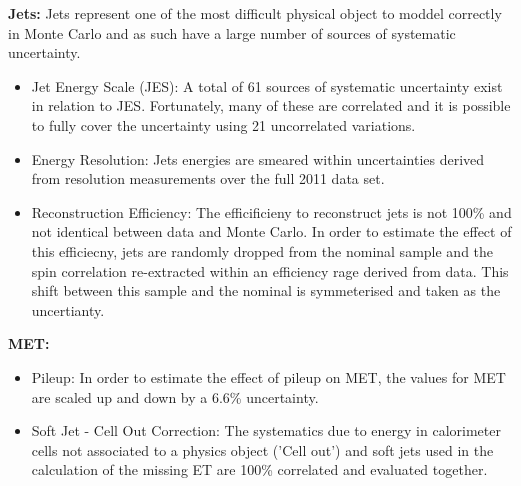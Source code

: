 \vspace{5mm}
\noindent
\textbf{Jets:}
Jets represent one of the most difficult physical object to moddel correctly in Monte Carlo and as such have a large number of sources of systematic uncertainty. 
\begin{itemize}
    \item Jet Energy Scale (JES): A total of 61 sources of systematic uncertainty exist in relation to JES. Fortunately, many of these are correlated and it is possible to fully cover the uncertainty using 21 uncorrelated variations.
    \item Energy Resolution: Jets energies are smeared within uncertainties derived from resolution measurements over the full 2011 data set. 
    \item Reconstruction Efficiency: The efficificieny to reconstruct jets is not 100\% and not identical between data and Monte Carlo. In order to estimate the effect of this efficiecny, jets are randomly dropped from the nominal sample and the spin correlation re-extracted within an efficiency rage derived from data. This shift between this sample and the nominal is symmeterised and taken as the uncertianty.
\end{itemize}

\vspace{5mm}
\noindent
\textbf{MET:}
\begin{itemize}
    \item Pileup: In order to estimate the effect of pileup on MET, the values for MET are scaled up and down by a 6.6\% uncertainty. 
    \item Soft Jet - Cell Out Correction: The systematics due to energy in calorimeter cells not associated to a physics object ('Cell out') and soft jets used in the calculation of the missing ET are 100\% correlated and evaluated together. 
\end{itemize}

